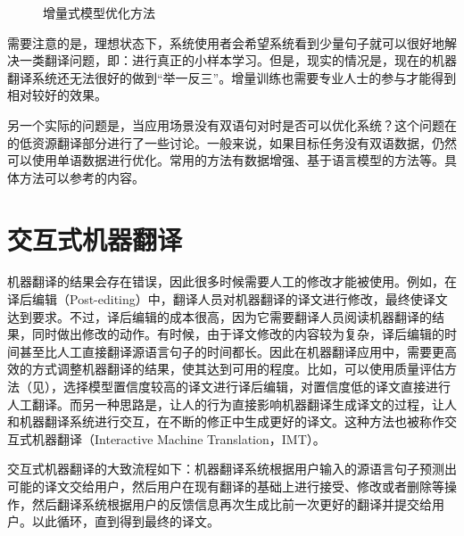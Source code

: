 \begin{figure}[htp]
\centering

\caption{增量式模型优化方法}
\label{fig:18-1}
\end{figure}

\parinterval 需要注意的是，理想状态下，系统使用者会希望系统看到少量句子就可以很好地解决一类翻译问题，即：进行真正的小样本学习。但是，现实的情况是，现在的机器翻译系统还无法很好的做到“举一反三”。增量训练也需要专业人士的参与才能得到相对较好的效果。

\parinterval 另一个实际的问题是，当应用场景没有双语句对时是否可以优化系统？这个问题在{\chaptersixteen}的低资源翻译部分进行了一些讨论。一般来说，如果目标任务没有双语数据，仍然可以使用单语数据进行优化。常用的方法有数据增强、基于语言模型的方法等。具体方法可以参考{\chaptersixteen}的内容。


\section{交互式机器翻译}

\parinterval 机器翻译的结果会存在错误，因此很多时候需要人工的修改才能被使用。例如，在{\small\bfnew 译后编辑}（Post-editing）中，翻译人员对机器翻译的译文进行修改，最终使译文达到要求。不过，译后编辑的成本很高，因为它需要翻译人员阅读机器翻译的结果，同时做出修改的动作。有时候，由于译文修改的内容较为复杂，译后编辑的时间甚至比人工直接翻译源语言句子的时间都长。因此在机器翻译应用中，需要更高效的方式调整机器翻译的结果，使其达到可用的程度。比如，可以使用质量评估方法（见{\chapterfour}），选择模型置信度较高的译文进行译后编辑，对置信度低的译文直接进行人工翻译。而另一种思路是，让人的行为直接影响机器翻译生成译文的过程，让人和机器翻译系统进行交互，在不断的修正中生成更好的译文。这种方法也被称作{\small\bfnew 交互式机器翻译}（Interactive Machine Translation，IMT）。

\parinterval 交互式机器翻译的大致流程如下：机器翻译系统根据用户输入的源语言句子预测出可能的译文交给用户，然后用户在现有翻译的基础上进行接受、修改或者删除等操作，然后翻译系统根据用户的反馈信息再次生成比前一次更好的翻译并提交给用户。以此循环，直到得到最终的译文。

